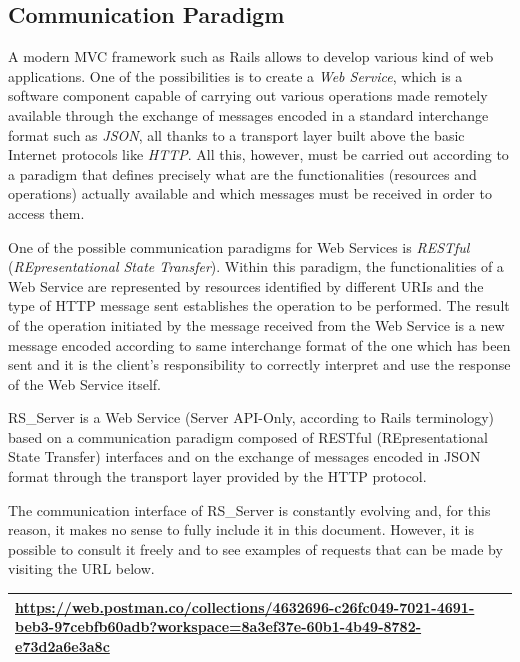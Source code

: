 \documentclass[a4paper, english]{article}
\begin{document}
\subsection{Communication Paradigm}

A modern MVC framework such as Rails allows to develop various kind of web applications. One of the possibilities is to create a \emph{Web Service}, which is a software component capable of carrying out various operations made remotely available through the exchange of messages encoded in a standard interchange format such as \emph{JSON}, all thanks to a transport layer built above the basic Internet protocols like \emph{HTTP}. All this, however, must be carried out according to a paradigm that defines precisely what are the functionalities (resources and operations) actually available and which messages must be received in order to access them.

One of the possible communication paradigms for Web Services is \emph{RESTful} (\emph{REpresentational State Transfer}). Within this paradigm, the functionalities of a Web Service are represented by resources identified by different URIs and the type of HTTP message sent establishes the operation to be performed. The result of the operation initiated by the message received from the Web Service is a new message encoded according to same interchange format of the one which has been sent and it is the client's responsibility to correctly interpret and use the response of the Web Service itself.

RS\_Server is a Web Service (Server API-Only, according to Rails terminology) based on a communication paradigm composed of RESTful (REpresentational State Transfer) interfaces and on the exchange of messages encoded in JSON format through the transport layer provided by the HTTP protocol.

The communication interface of RS\_Server is constantly evolving and, for this reason, it makes no sense to fully include it in this document. However, it is possible to consult it freely and to see examples of requests that can be made by visiting the URL below.

\begin{table}[h]
\centering
\begin{tabular}{p{12cm}}
  \toprule
	\url{https://web.postman.co/collections/4632696-c26fc049-7021-4691-beb3-97cebfb60adb?workspace=8a3ef37e-60b1-4b49-8782-e73d2a6e3a8c}  \\
 \toprule
  \end{tabular}
\end{table}
\end{document}
